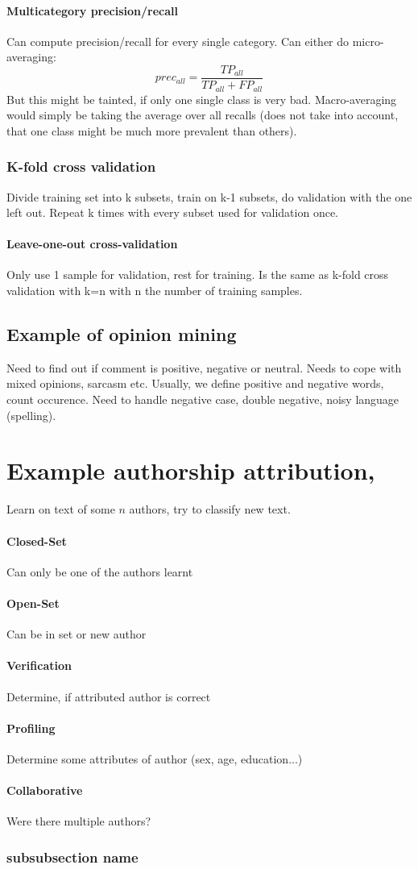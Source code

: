 \documentclass[11pt]{article}
\begin{document}
\paragraph{Multicategory precision/recall}
Can compute precision/recall for every single category. Can either do micro-averaging:
\begin{equation}
	prec_{all} = \frac{TP_{all}}{TP_{all} + FP_{all}}
\end{equation}
But this might be tainted, if only one single class is very bad. Macro-averaging would simply be taking the average over all recalls (does not take into
account, that one class might be much more prevalent than others). 

\subsubsection{K-fold cross validation}
Divide training set into k subsets, train on k-1 subsets, do validation with the one left out. Repeat k times with every subset used for validation once.
\paragraph{Leave-one-out cross-validation}
Only use 1 sample for validation, rest for training. Is the same as k-fold cross validation
with k=n with n the number of training samples.

\subsection{Example of opinion mining}
Need to find out if comment is positive, negative or neutral. Needs to cope with mixed
opinions, sarcasm etc. Usually, we define positive and negative words, count occurence. 
Need to handle negative case, double negative, noisy language (spelling).

\section{Example authorship attribution, }
Learn on text of some $n$ authors, try to classify new text. 
\paragraph{Closed-Set} Can only be one of the authors learnt
\paragraph{Open-Set} Can be in set or new author
\paragraph{Verification} Determine, if attributed author is correct
\paragraph{Profiling} Determine some attributes of author (sex, age, education...)
\paragraph{Collaborative} Were there multiple authors?

\subsubsection{subsubsection name}
\label{ssub:}

\end{document}
